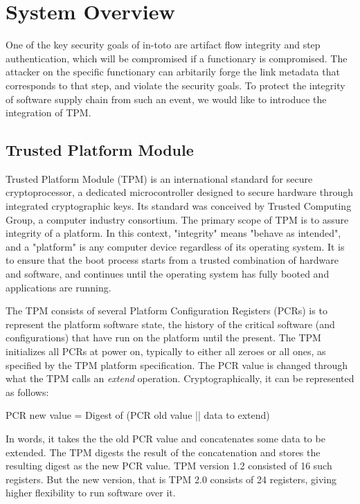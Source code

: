 \section{System Overview}
One of the key security goals of in-toto are artifact flow integrity and step authentication, which will be compromised if a functionary is compromised. The attacker on the specific functionary can arbitarily forge the link metadata that corresponds to that step, and violate the security goals. To protect the integrity of software supply chain from such an event, we would like to introduce the integration of TPM.

\subsection{Trusted Platform Module}
Trusted Platform Module (TPM) is an international standard for secure cryptoprocessor, a dedicated microcontroller designed to secure hardware through integrated cryptographic keys. Its standard was conceived by Trusted Computing Group, a computer industry consortium. The primary scope of TPM is to assure integrity of a platform. In this context, "integrity" means "behave as intended", and a "platform" is any computer device regardless of its operating system. It is to ensure that the boot process starts from a trusted combination of hardware and software, and continues until the operating system has fully booted and applications are running.

The TPM consists of several Platform Configuration Registers (PCRs) is to represent the platform software state, the history of the critical software (and configurations) that have run on the platform until the present. The TPM initializes all PCRs at power on, typically to either all zeroes or all ones, as specified by the TPM platform specification. The PCR value is changed through what the TPM calls an \textit{extend} operation. Cryptographically, it can be represented as follows:

PCR new value = Digest of (PCR old value || data to extend)

In words, it takes the the old PCR value and concatenates some data to be extended. The TPM digests the result of the concatenation and stores the resulting digest as the new PCR value. TPM version 1.2 consisted of 16 such registers. But the new version, that is TPM 2.0 consists of 24 registers, giving higher flexibility to run software over it.
